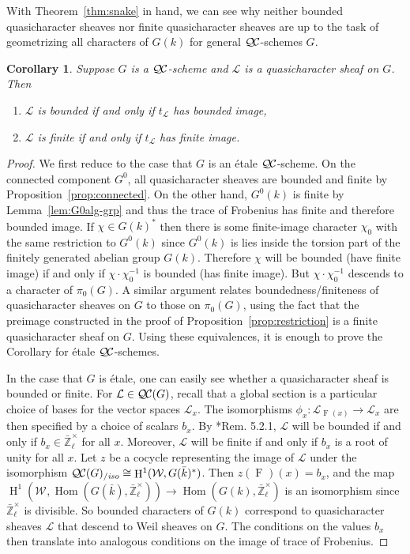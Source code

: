 \documentclass[11pt]{amsart}
\theoremstyle{plain}
\newtheorem{corollary}[theorem]{Corollary}
\theoremstyle{definition}
\theoremstyle{remark}
\newcommand{\bFq}{\bar{k}}
\newcommand{\Fq}{k}
\newcommand{\Zlx}{\mathbb{\bar Z}_\ell^\times}
\newcommand{\Frob}[1]{\operatorname{F}_{#1}}
\DeclareMathOperator{\Hom}{Hom}
\DeclareMathOperator{\Hh}{H}
\newcommand{\qcs}[1]{{\mathcal{#1}}}
\newcommand{\QC}{{\mathcal{Q\hskip-0.8pt C}}}
\newcommand{\QCiso}[1]{\QC(#1)_{/\textit{iso}}}
\newcommand{\Weil}[1]{\mathcal{W}_{#1}}
\newcommand{\trFrob}[1]{t_{#1}}
\begin{document}
With Theorem~\ref{thm:snake} in hand, 
we can see why neither bounded quasicharacter sheaves 
nor finite quasicharacter sheaves are up to the task of 
geometrizing all characters of $G(\Fq)$ for general $\QC$-schemes $G$.  

\begin{corollary} \label{cor:bounded-and-finite}
Suppose $G$ is a $\QC$-scheme and $\qcs{L}$ is a quasicharacter sheaf on $G$.  Then
\begin{enumerate}
\item $\qcs{L}$ is bounded if and only if $\trFrob{\qcs{L}}$ has bounded image,
\item $\qcs{L}$ is finite if and only if $\trFrob{\qcs{L}}$ has finite image.
\end{enumerate}
\end{corollary}
\begin{proof}
We first reduce to the case that $G$ is an \'etale $\QC$-scheme.  On the connected component
$G^0$, all quasicharacter sheaves are bounded and finite by Proposition~\ref{prop:connected}.
On the other hand, $G^0(\Fq)$ is finite by Lemma~\ref{lem:G0alg-grp} and thus the trace of Frobenius
has finite and therefore bounded image.  If $\chi \in G(\Fq)^*$ then there is some finite-image character $\chi_0$
with the same restriction to $G^0(\Fq)$ since $G^0(\Fq)$ is lies inside the torsion part of
the finitely generated abelian group $G(\Fq)$.  Therefore $\chi$ will be bounded (have finite image)
if and only if $\chi \cdot \chi_0^{-1}$ is bounded (has finite image).  But $\chi \cdot \chi_0^{-1}$ descends
to a character of $\pi_0(G)$.  A similar argument relates boundedness/finiteness of quasicharacter
sheaves on $G$ to those on $\pi_0(G)$, using the fact that the preimage constructed in the proof of
Proposition~\ref{prop:restriction} is a finite quasicharacter sheaf on $G$.  Using these equivalences, it is enough to prove the Corollary
for \'etale $\QC$-schemes.

In the case that $G$ is \'etale, one can easily see whether a quasicharacter sheaf is bounded or finite.
For $\qcs{L} \in \QC(G)$, recall that a global section is a particular choice of bases for the vector
spaces $\qcs{L}_x$.  The isomorphisms $\phi_x : \qcs{L}_{\Frob{}(x)} \to \qcs{L}_x$ are then specified
by a choice of scalars $b_x$.  By \cite{beilinson-bernstein-deligne:81a}*{Rem. 5.2.1},
$\qcs{L}$ will be bounded if and only if $b_x \in \Zlx$ for all $x$.  Moreover, $\qcs{L}$ will be
finite if and only if $b_x$ is a root of unity for all $x$.
Let $z$ be a cocycle representing the image of $\qcs{L}$ under the isomorphism
$\QCiso{G} \cong \Hh^1(\Weil{}, G(\bFq)^*)$.  Then $z(\Frob{})(x) = b_x$, and the
map $\Hh^1(\Weil{}, \Hom(G(\bFq), \Zlx)) \to \Hom(G(\Fq), \Zlx)$ is an isomorphism
since $\Zlx$ is divisible.  So bounded characters of $G(\Fq)$ correspond to quasicharacter sheaves
$\qcs{L}$ that descend to Weil sheaves on $G$.  The conditions on the values $b_x$ then
translate into analogous conditions on the image of trace of Frobenius.
\end{proof}
\end{document}

